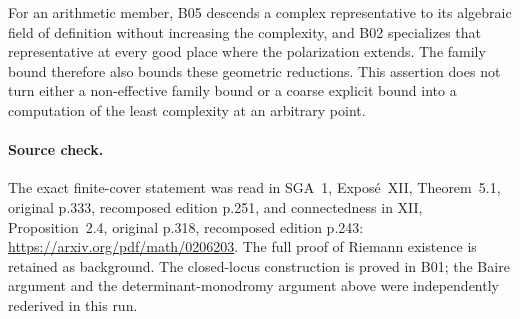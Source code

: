 For an arithmetic member, B05 descends a complex representative to its
algebraic field of definition without increasing the complexity, and
B02 specializes that representative at every good place where the
polarization extends. The family bound therefore also bounds these
geometric reductions. This assertion does not turn either a
non-effective family bound or a coarse explicit bound into a
computation of the least complexity at an arbitrary point.

\paragraph{Source check.}
The exact finite-cover statement was read in SGA~1, Expos\'e~XII,
Theorem~5.1, original p.333, recomposed edition p.251, and connectedness
in XII, Proposition~2.4, original p.318, recomposed edition p.243:
\url{https://arxiv.org/pdf/math/0206203}. The full proof of Riemann
existence is retained as background. The closed-locus construction is
proved in B01; the Baire argument and the determinant-monodromy argument
above were independently rederived in this run.
